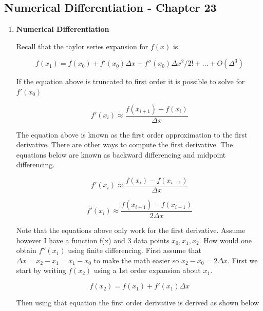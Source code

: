 \subsection{Numerical Differentiation - Chapter 23}

\begin{enumerate}

  \item {\bf Numerical Differentiation}

    Recall that the taylor series expansion for $f(x)$ is

    \begin{equation} 
      f(x_1) = f(x_0) + f'(x_0)\Delta x + f''(x_0)\Delta x^2/2! +
      ... + O(\Delta^3)
    \end{equation}

    If the equation above is truncated to first order it is possible
    to solve for $f'(x_0)$

    \begin{equation}
      f'(x_{i}) \approx \frac{f(x_{i+1})-f(x_i)}{\Delta x}
    \end{equation}

    The equation above is known as the first order approximation to
    the first derivative. There are other ways to compute the first
    derivative. The equations below are known as backward differencing
    and midpoint differencing.
    
    \begin{equation}
      f'(x_{i}) \approx \frac{f(x_{i})-f(x_{i-1})}{\Delta x}
    \end{equation}

    \begin{equation}
      f'(x_{i}) \approx \frac{f(x_{i+1})-f(x_{i-1})}{2 \Delta x}
    \end{equation}

    Note that the equations above only work for the first
    derivative. Assume however I have a function f(x) and 3 data
    points $x_0,x_1,x_2$. How would one obtain $f''(x_1)$  using
    finite differencing. First assume that $\Delta x =x_2-x_1=x_1-x_0$
    to make the math easier so $x_2-x_0=2\Delta x$. First we start by
    writing $f(x_2)$ using a 1st order expansion about $x_1$.

    \begin{equation}
      f(x_2) = f(x_1) + f'(x_1)\Delta x
    \end{equation}

    Then using that equation the first order derivative is derived as
    shown below


\end{enumerate}
